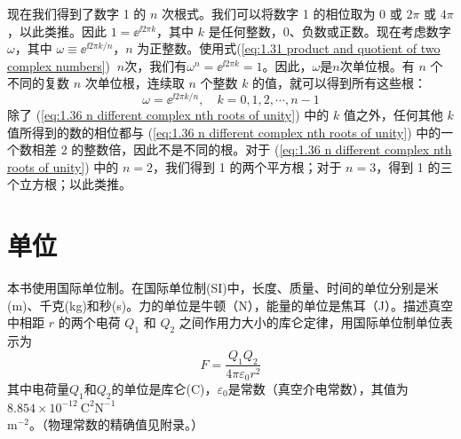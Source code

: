 	现在我们得到了数字 1 的 $n$ 次根式。我们可以将数字 1 的相位取为 0 或 $2\pi$ 或 $4\pi$，以此类推。因此 $1 = \ee^{\ii 2\pi k}$，其中 $k$ 是任何整数，0、负数或正数。现在考虑数字 $\omega$，其中 $\omega \equiv \ee^{\ii 2\pi k /n}$，$n$ 为正整数。使用式(\ref{eq:1.31 product and quotient of two complex numbers}) $\:$$n$次，我们有$\omega^n = \ee^{\ii2 \pi k} = 1$。因此，$\omega$是$n$次单位根。有 $n$ 个不同的复数 $n$ 次单位根，连续取 $n$ 个整数 $k$ 的值，就可以得到所有这些根：
	\begin{equation}
		\omega = \ee^{\ii 2\pi k /n}, \quad k = 0,1,2,\cdots , n-1
		\label{eq:1.36 n different complex nth roots of unity}
	\end{equation}
	除了 (\ref{eq:1.36 n different complex nth roots of unity}) 中的 $k$ 值之外，任何其他 $k$ 值所得到的数的相位都与 (\ref{eq:1.36 n different complex nth roots of unity}) 中的一个数相差 $2$ 的整数倍，因此不是不同的根。对于 (\ref{eq:1.36 n different complex nth roots of unity}) 中的 $n=2$，我们得到 1 的两个平方根；对于 $n=3$，得到 1 的三个立方根；以此类推。
	
\section{单位}
\label{sec:1.7 Units}

	本书使用国际单位制。在国际单位制(SI)中，长度、质量、时间的单位分别是米(m)、千克(kg)和秒(s)。力的单位是牛顿（N），能量的单位是焦耳（J）。描述真空中相距 $r$ 的两个电荷 $Q_1$ 和 $Q_2$ 之间作用力大小的库仑定律，用国际单位制单位表示为
	\begin{equation}
		\boxed{F = \frac{Q_1Q_2}{4\pi \varepsilon_0r^2}}
		\label{eq:1.37 coulomb's law}
	\end{equation}
	其中电荷量$Q_1$和$Q_2$的单位是库仑(C)，$\varepsilon_0$是常数（真空介电常数），其值为$8.854 \times 10^{-12} \:\mathrm{C}^2\mathrm{N}^{-1}$\\$\mathrm{m}^{-2}$。（物理常数的精确值见附录。）
	
